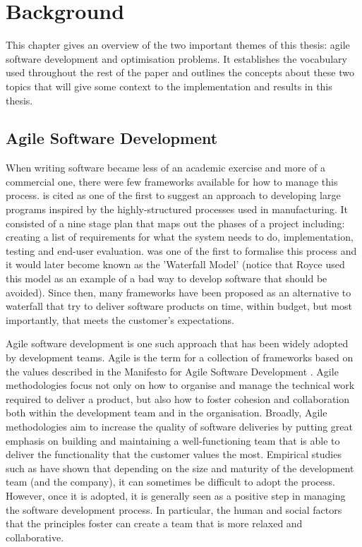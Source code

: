 
\chapter{Background}\label{ChapterBackground}

This chapter gives an overview of the two important themes of this thesis: agile software development and optimisation problems. It establishes the vocabulary used throughout the rest of the paper and outlines the concepts about these two topics that will give some context to the implementation and results in this thesis.

\section{Agile Software Development}

When writing software became less of an academic exercise and more of a commercial one, there were few frameworks available for how to manage this process. \citet{benington1983production} is cited as one of the first to suggest an approach to developing large programs inspired by the highly-structured processes used in manufacturing. It consisted of a nine stage plan that maps out the phases of a project including: creating a list of requirements for what the system needs to do, implementation, testing and end-user evaluation. \citet{royce1987managing} was one of the first to formalise this process and it would later become known as the 'Waterfall Model' (notice that Royce used this model as an example of a bad way to develop software that should be avoided). Since then, many frameworks have been proposed as an alternative to waterfall that try to deliver software products on time, within budget, but most importantly, that meets the customer's expectations.

Agile software development is one such approach that has been widely adopted by development teams. Agile is the term for a collection of frameworks based on the values described in the Manifesto for Agile Software Development \citep{beck2001manifesto}. Agile methodologies focus not only on how to organise and manage the technical work required to deliver a product, but also how to foster cohesion and collaboration both within the development team and in the organisation. Broadly, Agile methodologies aim to increase the quality of software deliveries by putting great emphasis on building and maintaining a well-functioning team that is able to deliver the functionality that the customer values the most. Empirical studies such as \citet{dybaa2008empirical} have shown that depending on the size and maturity of the development team (and the company), it can sometimes be difficult to adopt the process. However, once it is adopted, it is generally seen as a positive step in managing the software development process. In particular, the human and social factors that the principles foster can create a team that is more relaxed and collaborative.

